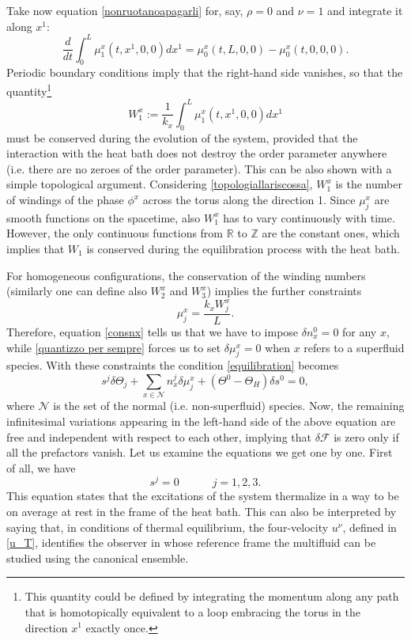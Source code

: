 \documentclass[usenatbib]{mnras}
\newcommand{\spc}{\quad \quad \quad}
\begin{document}
Take now  equation \eqref{nonruotanoapagarli} for, say, $\rho=0$ and $\nu=1$ and integrate it along $x^1$: 
%
\begin{equation}
\dfrac{d}{dt} \int_0^L \mu_1^x(t,x^1,0,0) dx^1 = \mu_0^x(t,L,0,0) - \mu_0^x(t,0,0,0).
\end{equation}
%
Periodic boundary conditions imply that the right-hand side vanishes, so that the quantity\footnote{
This quantity could be defined by integrating the momentum along any  path that is homotopically equivalent to a loop embracing the torus in the direction $x^1$ exactly once.
}
%
\begin{equation}\label{windino}
W_{1}^x :=\dfrac{1}{k_x} \int_0^L \mu_1^x(t,x^1,0,0) dx^1
\end{equation}
%
must be conserved during the evolution of the system, provided that the interaction with the heat bath does not destroy the order parameter anywhere (i.e. there are no zeroes of the order parameter). This can be also shown with a simple topological argument. Considering \eqref{topologiallariscossa},  $W_1^x$  is the number of windings of the phase $\phi^x$ across the torus along the direction 1. Since $\mu_j^x$ are smooth functions on the spacetime, also $W_1^x$ has to vary continuously with time. However, the only continuous functions from $\mathbb{R}$ to $\mathbb{Z}$ are the constant ones, which implies that $W_1$ is conserved during the equilibration process with the heat bath. 

For homogeneous configurations, the conservation of the winding numbers (similarly one can define also $W_2^x$ and $W_3^x$) implies  the further constraints
%
\begin{equation}\label{quantizzo per sempre}
\mu_j^x = \dfrac{k_x W^x_j}{L}.
\end{equation}
%
Therefore, equation \eqref{consnx}  tells us that we have to impose $\delta n_x^0=0$ for any $x$, while 
\eqref{quantizzo per sempre} forces us to set $\delta \mu_j^x=0$ when $x$ refers to a superfluid species. 
With these constraints the condition \eqref{equilibration} becomes
%
\begin{equation}\label{equilibration2}
 s^j \delta \Theta_j + \sum_{x \in \mathcal{N}}  n_x^j \delta \mu_{j}^x +(\Theta^0 -\Theta_H)\delta s^0  =0 ,
\end{equation}
%
where $\mathcal{N}$ is the set of the normal (i.e. non-superfluid) species. 
Now, the remaining infinitesimal variations appearing in the left-hand side of the above equation are free and independent with respect to each other, implying that $\delta \mathcal{F}$ is zero only if all the prefactors vanish. Let us examine the equations we get one by one. First of all, we have
%
\begin{equation}\label{freniamolentropia}
s^j=0  \spc  j=1,2,3.
\end{equation}
%
This equation states that the excitations of the system thermalize in a way to be on average at rest in the frame of the heat bath. This can also be interpreted by saying that, in conditions of thermal equilibrium, the four-velocity $u^\nu$, defined in \eqref{u_T}, identifies the observer in whose reference frame the multifluid can be studied using the canonical ensemble. 
\end{document}
